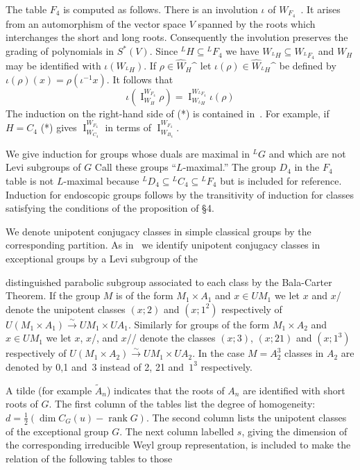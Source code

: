 \documentclass{amsart}
\newcommand\I		{\operatorname{I}}
\newcommand\rank	{\operatorname{rank}}
\newcommand\x		{\times}
\begin{document}
The table $F_4$ is computed as follows.  There is an involution
$\iota$
of $W_{F_4}$~\cite{K}.  It arises from an automorphism of the
vector space
$V$ spanned by the roots which interchanges the short and long
roots.
Consequently the involution preserves the grading of polynomials
in
$S^*(V)$.  Since ${}^L H \subseteq {}^L F_4$ we have
$W_{{}^L H} \subseteq W_{{}^L F_4}$ and $W_H$ may be identified
with
$\iota(W_{{}^L H})$.  If $\rho \in \hat{W}_H\sphat$ let 
$\iota(\rho) \in \hat{W}_{{}^L H}\sphat$ be defined by 
$\iota(\rho)(x) = \rho( \iota^{-1} x)$.  It follows that
     \begin{equation}\tag{*}
     \iota \left( \I_{W_H}^{W_{F_4}} \rho \right) = 
          \I_{W_{{}^L H}}^{W_{{}^L F_4}} \iota(\rho)
\end{equation}
The induction on the right-hand side of (*) is contained
in~\cite{A}.  For
example, if $H = C_4$ (*) gives $\I_{W_{C_4}}^{W_{F_4}}$ in terms
of
$\I_{W_{B_4}}^{W_{F_4}}$.

We give induction for groups whose duals are maximal in ${}^L G$
and which are
not Levi subgroups of $G$  Call these groups ``$L$-maximal.''  The
group
$D_4$ in the $F_4$ table is not $L$-maximal because
${}^L D_4 \subseteq {}^L C_4 \subseteq {}^L F_4$ but is included
for 
reference.  Induction for endoscopic groups follows 
by the transitivity of induction for classes satisfying the
conditions of
the proposition of \S 4.

We denote unipotent conjugacy classes in simple classical groups
by the
corresponding partition.  As in~\cite{C} we identify unipotent
conjugacy classes in exceptional groups by a Levi subgroup of the

distinguished parabolic subgroup associated to each class by the
Bala-Carter
Theorem.  If the group $M$ is of the form $M_1 \x A_1$ and $x \in
UM_1$ we let
$x$ and $x$/ denote the unipotent classes $(x;2)$ and $(x;1^2)$
respectively
of $U(M_1 \x A_1) \overset{\sim}{\longrightarrow} UM_1 \x
UA_1$.  
Similarly
for groups of the form $M_1 \x A_2$ and $x \in UM_1$ we let $x$,
$x$/, and 
$x$// denote the classes $(x;3)$, $(x;21)$ and $(x;1^3)$
respectively of
$U(M_1 \x A_2) \overset{\sim}{\longrightarrow} UM_1 \x UA_2$.
In the case $M = A_2^3$ classes in $A_2$ are denoted by 0,1 and~3
instead
of 2, 21 and~$1^3$ respectively.

A tilde (for example $\tilde A_n$) indicates that the roots
of $A_n$ are identified with short roots of $G$.  
The first column of the tables list the degree
of homogeneity:  $d = \frac 12 (\dim C_G(u) - \rank G)$.  The
second column
lists the unipotent classes of the exceptional group $G$.  The
next column 
labelled $s$, giving
the dimension of the corresponding irreducible Weyl group
representation,
is included to make the relation of the following tables to those
\end{document}
